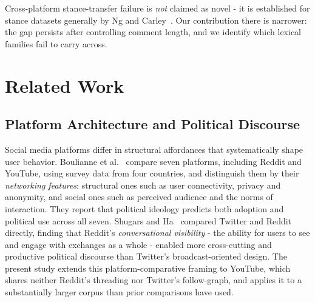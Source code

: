 \documentclass[pdflatex,sn-basic,Numbered,iicol]{sn-jnl}
\begin{document}
Cross-platform stance-transfer failure is \emph{not} claimed as novel - it is
established for stance datasets generally by Ng and Carley~\cite{ng2022}. Our
contribution there is narrower: the gap persists after controlling comment length,
and we identify which lexical families fail to carry across.

\section{Related Work}
\subsection{Platform Architecture and Political Discourse}
Social media platforms differ in structural affordances that systematically
shape user behavior. Boulianne et al.~\cite{boulianne2025} compare seven
platforms, including Reddit and YouTube, using survey data from four countries,
and distinguish them by their \emph{networking features}: structural ones such
as user connectivity, privacy and anonymity, and social ones such as perceived
audience and the norms of interaction. They report that political ideology
predicts both adoption and political use across all seven. Shugars and Ha~\cite{shugars2025}
compared Twitter and Reddit directly, finding that Reddit's \emph{conversational
visibility} - the ability for users to see and engage with exchanges as a
whole - enabled more cross-cutting and productive political discourse than
Twitter's broadcast-oriented design. The present study extends this
platform-comparative framing to YouTube, which shares neither Reddit's threading
nor Twitter's follow-graph, and applies it to a substantially larger corpus than
prior comparisons have used.
\end{document}
